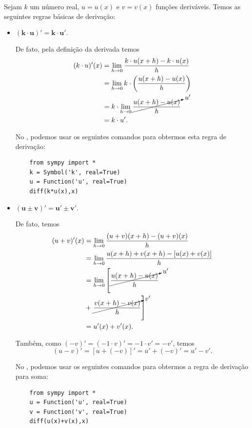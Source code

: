 Sejam $k$ um número real, $u = u(x)$ e $v = v(x)$ funções deriváveis. Temos as seguintes regras básicas de derivação:
\begin{itemize}
\item $\pmb{(k\cdot u)' = k\cdot u'}$.

  De fato, pela definição da derivada temos
  \begin{align}
    (k\cdot u)'(x) &= \lim_{h\to 0} \frac{k\cdot u(x+h)-k\cdot u(x)}{h} \\
                   &= \lim_{h\to 0} k\cdot \left(\frac{u(x+h)-u(x)}{h}\right) \\
                   &= k\cdot \lim_{h\to 0} \cancelto{u'}{\frac{u(x+h)-u(x)}{h}} \\
                   &= k\cdot u'.
  \end{align}
  
  \ifispython
  No \sympy, podemos usar os seguintes comandos para obtermos esta regra de derivação:
  \begin{lstlisting}
    from sympy import *
    k = Symbol('k', real=True)
    u = Function('u', real=True)
    diff(k*u(x),x)
  \end{lstlisting}
  \fi

\item $\pmb{(u\pm v)' = u'\pm v'}$.

  De fato, temos
  \begin{align}
    (u + v)'(x) &= \lim_{h\to 0} \frac{(u + v)(x+h)-(u + v)(x)}{h}\\
                &= \lim_{h\to 0} \frac{u(x+h)+v(x+h)-[u(x)+v(x)]}{h}\\
                &= \lim_{h\to 0} \left[\cancelto{u'}{\frac{u(x+h)-u(x)}{h}} \right. \\
                &+ \left. \cancelto{v'}{\frac{v(x+h)-v(x)}{h}}\right]\\
                &= u'(x) + v'(x).
  \end{align}

  Também, como $(-v)' = (-1\cdot v)' = -1\cdot v' = -v'$, temos
  \begin{equation}
    (u-v)' = [u+(-v)]' = u' + (-v)' = u' - v'.
  \end{equation}
  
  \ifispython
  No \sympy, podemos usar os seguintes comandos para obtermos a regra de derivação para soma:
  \begin{lstlisting}
    from sympy import *
    u = Function('u', real=True)
    v = Function('v', real=True)
    diff(u(x)+v(x),x)
  \end{lstlisting}
  \fi
\end{itemize}

